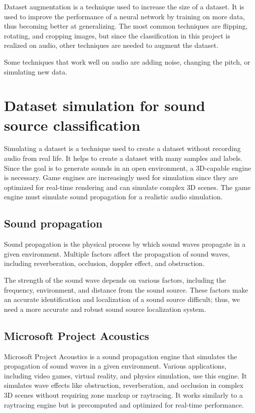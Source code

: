 Dataset augmentation is a technique used to increase the size of a dataset. It is used to improve the performance of a neural network by training on more data, thus becoming better at generalizing. The most common techniques are flipping, rotating, and cropping images, but since the classification in this project is realized on audio, other techniques are needed to augment the dataset. 

Some techniques that work well on audio are adding noise, changing the pitch, or simulating new data. 

\section{Dataset simulation for sound source classification}

Simulating a dataset is a technique used to create a dataset without recording audio from real life. It helps to create a dataset with many samples and labels. Since the goal is to generate sounds in an open environment, a 3D-capable engine is necessary. Game engines are increasingly used for simulation since they are optimized for real-time rendering and can simulate complex 3D scenes. The game engine must simulate sound propagation for a realistic audio simulation.

\subsection{Sound propagation}
Sound propagation is the physical process by which sound waves propagate in a given environment. Multiple factors affect the propagation of sound waves, including reverberation, occlusion, doppler effect, and obstruction.


The strength of the sound wave depends on various factors, including the frequency, environment, and distance from the sound source. These factors make an accurate identification and localization of a sound source difficult; thus, we need a more accurate and robust sound source localization system.

\subsection{Microsoft Project Acoustics}

Microsoft Project Acoustics is a sound propagation engine that simulates the propagation of sound waves in a given environment. Various applications, including video games, virtual reality, and physics simulation, use this engine. It simulates wave effects like obstruction, reverberation, and occlusion in complex 3D scenes without requiring zone markup or raytracing. It works similarly to a raytracing engine but is precomputed and optimized for real-time performance. 


